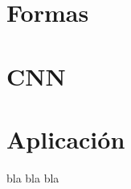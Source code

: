 \documentclass[a4paper,11pt]{book}
\begin{document}


\frontmatter


\tableofcontents

\mainmatter


\part{Formas}

\part{CNN}

\part{Aplicación}

bla bla bla



\end{document}
